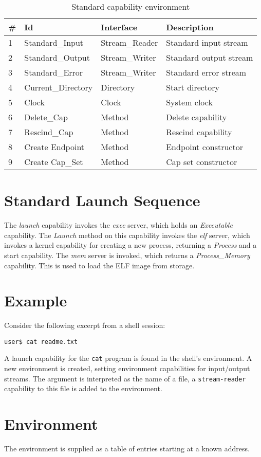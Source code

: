 \begin{table}[ht]
\begin{tabular}{l l l l}
\hline\hline
\# & Id & Interface & Description \\
\hline
1 & Standard\_Input & Stream\_Reader & Standard input stream \\
2 & Standard\_Output & Stream\_Writer & Standard output stream \\
3 & Standard\_Error & Stream\_Writer & Standard error stream \\
4 & Current\_Directory & Directory & Start directory \\
5 & Clock & Clock & System clock \\
6 & Delete\_Cap & Method & Delete capability \\
7 & Rescind\_Cap & Method & Rescind capability \\
8 & Create Endpoint & Method & Endpoint constructor \\
9 & Create Cap\_Set & Method & Cap set constructor \\
\hline
\end{tabular}
\caption{Standard capability environment}
\label{table:standard-cap-env}
\end{table}

\section{Standard Launch Sequence}

The {\em launch} capability invokes the {\em exec} server, which holds an {\em Executable} capability.  
The {\em Launch} method on this capability invokes the {\em elf} server,
which invokes a kernel capability for creating a new process, returning a {\em Process} and a start capability.
The {\em mem} server is invoked, which returns a {\em Process\_Memory} capability.
This is used to load the ELF image from storage.

\section{Example}

Consider the following excerpt from a shell session:

{\tt user\$ cat readme.txt }

A launch capability for the {\tt cat} program is found in the shell's environment.  A new environment is created, setting environment capabilities for input/output streams.  The argument is interpreted as the name of a file, a {\tt stream-reader} capability to this file is added to the environment.

\section{Environment}

The environment is supplied as a table of entries starting at a known address.

